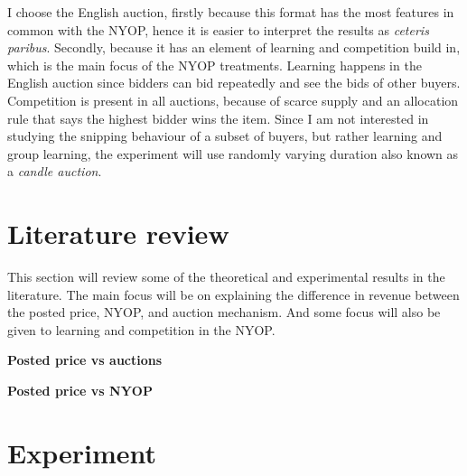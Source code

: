 \documentclass[a4paper,12pt]{article}
\begin{document}
	I choose the English auction, firstly because this format has the most features in common with the NYOP, hence it is easier to interpret the results as {\it ceteris paribus}. Secondly, because it has an element of learning and competition build in, which is the main focus of the NYOP treatments. Learning happens in the English auction since bidders can bid repeatedly and see the bids of other buyers. Competition is present in all auctions, because of scarce supply and an allocation rule that says the highest bidder wins the item. Since I am not interested in studying the snipping behaviour of a subset of buyers, but rather learning and group learning, the experiment will use randomly varying duration also known as a {\it candle auction}.

	\section{Literature review}

This section will review some of the theoretical and experimental results in the literature. The main focus will be on explaining the difference in revenue between the posted price, NYOP, and auction mechanism. And some focus will also be given to learning and competition in the NYOP.


	{\bf Posted price vs auctions}

	{\bf Posted price vs NYOP}


	\section{Experiment}
\end{document}
